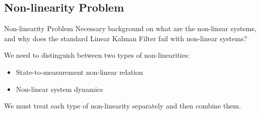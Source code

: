 \subsection{Non-linearity Problem}

\begin{frame}{Non-linearity Problem}
    Necessary background on what are the non-linear systems, and why does the standard Linear Kalman Filter fail with non-linear systems?

    We need to distinguish between two types of non-linearities:

    \begin{itemize}
        \item State-to-measurement non-linear relation
        \item Non-linear system dynamics
    \end{itemize}

We must treat each type of non-linearity separately and then combine them.
\end{frame}

